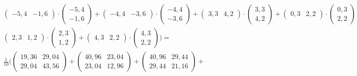 \documentclass[a4paper,parskip=full-]{article}
\begin{document}
\begin{multline}
\begin{pmatrix} -5,4 &  -1,6 \end{pmatrix} \cdot
\begin{pmatrix} -5,4 \\ -1,6 \end{pmatrix} +
\begin{pmatrix} -4,4 &  -3,6 \end{pmatrix} \cdot
\begin{pmatrix} -4,4 \\ -3,6 \end{pmatrix} +
\begin{pmatrix} 3,3 &  4,2 \end{pmatrix} \cdot
\begin{pmatrix} 3,3 \\ 4,2 \end{pmatrix} +
\begin{pmatrix} 0,3 &  2,2 \end{pmatrix} \cdot
\begin{pmatrix} 0,3 \\ 2,2 \end{pmatrix} +
\begin{pmatrix} 3,3 &  -0,8 \end{pmatrix} \cdot
\begin{pmatrix} 3,3 \\ -0,8 \end{pmatrix} + \\
\begin{pmatrix} 2,3 &  1,2 \end{pmatrix} \cdot
\begin{pmatrix} 2,3 \\ 1,2 \end{pmatrix} +
\begin{pmatrix} 4,3 &  2,2 \end{pmatrix} \cdot
\begin{pmatrix} 4,3 \\ 2,2 \end{pmatrix}  
\Biggr) = \\ \frac{1}{10} \Biggl(
\begin{pmatrix} 19,36 & 29,04 \\ 29,04 & 43,56 \end{pmatrix} +
\begin{pmatrix} 40,96 & 23,04 \\ 23,04 & 12,96 \end{pmatrix} +
\begin{pmatrix} 40,96 & 29,44 \\ 29,44 & 21,16 \end{pmatrix} +

\end{multline}
\end{document}

